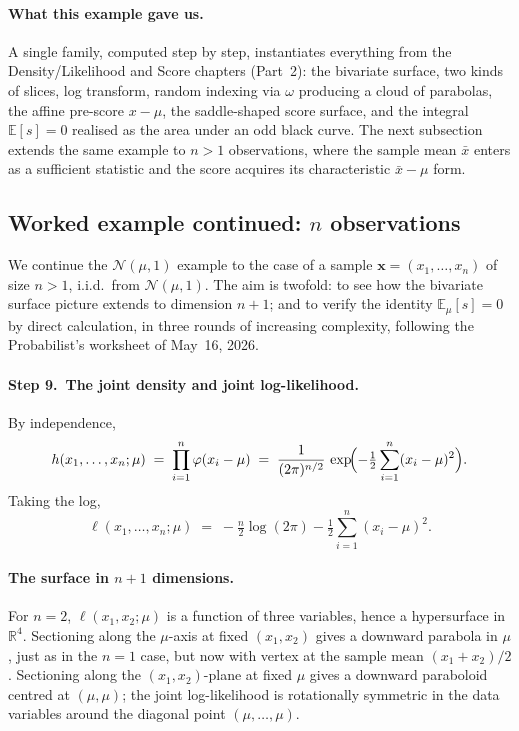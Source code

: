 \documentclass[a4paper,oneside,12pt]{extarticle}
\theoremstyle{plain}
\theoremstyle{definition}
\theoremstyle{remark}
\newcommand*{\E}{\mathbb{E}}
\begin{document}
\paragraph{What this example gave us.}
A single family, computed step by step, instantiates everything from
the Density/Likelihood and Score chapters (Part~2):
the bivariate surface, two kinds of slices, log transform, random
indexing via $\omega$ producing a cloud of parabolas, the affine
pre-score $x - \mu$, the saddle-shaped score surface, and the
integral $\E[s] = 0$ realised as the area under an odd black curve.
The next subsection extends the same example to $n > 1$ observations,
where the sample mean $\bar x$ enters as a sufficient statistic and
the score acquires its characteristic $\bar x - \mu$ form.

\subsection{Worked example continued: $n$ observations}
\label{sec:normal_example_n_obs}

We continue the $\mathcal{N}(\mu,1)$ example to the case of a
sample $\mathbf{x} = (x_1,\ldots,x_n)$ of size $n>1$, i.i.d.\ from
$\mathcal{N}(\mu,1)$.  The aim is twofold: to see how the bivariate
surface picture extends to dimension $n+1$; and to verify the
identity $\E_\mu[s] = 0$ by direct calculation, in three rounds of
increasing complexity, following the Probabilist's worksheet of
May~16, 2026.

\paragraph{Step 9.\ The joint density and joint log-likelihood.}
By independence,
\[
  h(x_1,\ldots,x_n; \mu)
  \;=\; \prod_{i=1}^n \varphi(x_i - \mu)
  \;=\; \frac{1}{(2\pi)^{n/2}}\,
  \exp\!\Bigl(-\tfrac{1}{2}\sum_{i=1}^n (x_i - \mu)^2\Bigr).
\]
Taking the log,
\[
  \ell(x_1,\ldots,x_n; \mu)
  \;=\; -\tfrac{n}{2}\log(2\pi) - \tfrac{1}{2}\sum_{i=1}^n (x_i - \mu)^2.
\]

\paragraph{The surface in $n+1$ dimensions.}
For $n=2$, $\ell(x_1, x_2; \mu)$ is a function of three variables,
hence a hypersurface in $\mathbb{R}^4$.  Sectioning along the
$\mu$-axis at fixed $(x_1, x_2)$ gives a downward parabola in $\mu$,
just as in the $n=1$ case, but now with vertex at the sample mean
$(x_1 + x_2)/2$.  Sectioning along the $(x_1, x_2)$-plane at fixed
$\mu$ gives a downward paraboloid centred at $(\mu, \mu)$; the joint
log-likelihood is rotationally symmetric in the data variables
around the diagonal point $(\mu, \ldots, \mu)$.
\end{document}
